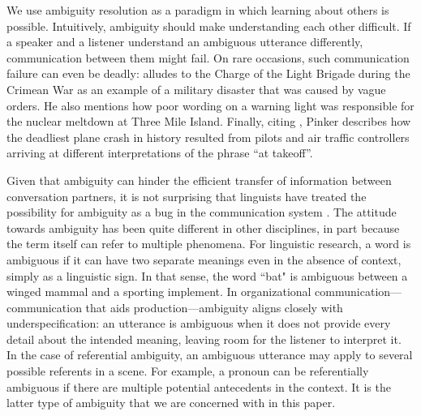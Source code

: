 \documentclass[10pt,a4paper]{article}
\begin{document}

We use ambiguity resolution as a paradigm in which learning about others is possible.
Intuitively, ambiguity should make understanding each other difficult.
If a speaker and a listener understand an ambiguous utterance differently, communication between them might fail.
On rare occasions, such communication failure can even be deadly: 
 alludes to the Charge of the Light Brigade during the Crimean War as an example of a military disaster that was caused by vague orders.
He also mentions how poor wording on a warning light was responsible for the nuclear meltdown at Three Mile Island. Finally, citing , Pinker describes how the deadliest plane crash in history resulted from pilots and air traffic controllers arriving at different interpretations of the phrase ``at takeoff''.

Given that ambiguity can hinder the efficient transfer of information between conversation partners, it is not surprising that linguists have treated the possibility for ambiguity as a bug in the communication system \cite{grice1975,chomsky2002minimalism}. The attitude towards ambiguity has been quite different in other disciplines, in part because the term itself can refer to multiple phenomena. For linguistic research, a word is ambiguous if it can have two separate meanings even in the absence of context, simply as a linguistic sign. In that sense, the word ``bat" is ambiguous between a winged mammal and a sporting implement. In organizational communication---communication that aids production---ambiguity aligns closely with underspecification: an utterance is ambiguous when it does not provide every detail about the intended meaning, leaving room for the listener to interpret it. In the case of referential ambiguity, an ambiguous utterance may apply to several possible referents in a scene. For example, a pronoun can be referentially ambiguous if there are multiple potential antecedents in the context. It is the latter type of ambiguity that we are concerned with in this paper.
\end{document}

